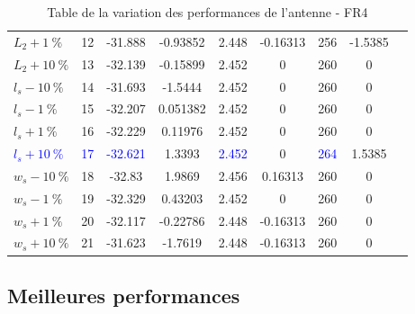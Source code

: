 \documentclass[Deriaz_Traiber_Labo02]{subfiles}
\begin{document}
\begin{table}[H]
\begin{tabular}{|l|c|cc|cc|cc|c|}
    $ L_2 + \SI{ 1}{\percent}  $ &  12  &  -31.888  &  -0.93852  &  2.448  &   -0.16313  &   256  &    -1.5385\\                                                         
    $ L_2 + \SI{10}{\percent}  $ &  13  &  -32.139  &  -0.15899  &  2.452  &          0  &   260  &          0\\\hline                                                         
    $ l_s - \SI{10}{\percent}  $ &  14  &  -31.693  &   -1.5444  &  2.452  &          0  &   260  &          0\\                                                         
    $ l_s - \SI{ 1}{\percent}  $ &  15  &  -32.207  &  0.051382  &  2.452  &          0  &   260  &          0\\                                                         
    $ l_s + \SI{ 1}{\percent}  $ &  16  &  -32.229  &   0.11976  &  2.452  &          0  &   260  &          0\\                                                         
    \textcolor{blue}{$ l_s + \SI{10}{\percent}$}   & \textcolor{blue}{17} & \textcolor{blue}{-32.621} & 1.3393 & \textcolor{blue}{2.452} & 0 & \textcolor{blue}{264} & 1.5385\\\hline                                                         
    $ w_s - \SI{10}{\percent}  $ &  18  &   -32.83  &    1.9869  &  2.456  &    0.16313  &   260  &          0\\                                                         
    $ w_s - \SI{ 1}{\percent}  $ &  19  &  -32.329  &   0.43203  &  2.452  &          0  &   260  &          0\\                                                         
    $ w_s + \SI{ 1}{\percent}  $ &  20  &  -32.117  &  -0.22786  &  2.448  &   -0.16313  &   260  &          0\\                                                         
    $ w_s + \SI{10}{\percent}  $ &  21  &  -31.623  &   -1.7619  &  2.448  &   -0.16313  &   260  &          0\\\hline            
\end{tabular}
\caption{Table de la variation des performances de l'antenne - FR4}
\label{tab:param-sweep-fr4}
\end{table}

\subsection{Meilleures performances}
\end{document}
